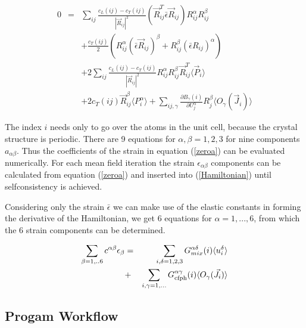 \begin{eqnarray}\label{zeroa}
0&=& \sum_{ij} \frac{c_L(ij)-c_T(ij)}{|\vec R_{ij}|^2} 
(\vec R_{ij}^T\bar \epsilon \vec R_{ij})R_{ij}^{\alpha}R_{ij}^{\beta}   \\
      && + \frac{c_T(ij)}{2} (R_{ij}^{\alpha} (\bar \epsilon \vec R_{ij})^{\beta}+R_{ij}^{\beta} (\bar \epsilon R_{ij})^{\alpha}) \nonumber \\
&& +2\sum_{ij} \frac{c_L(ij)-c_T(ij)}{|\vec R_{ij}|^2} 
R_{ij}^{\alpha}R_{ij}^{\beta} \vec R_{ij}^T \langle \vec P_{i} \rangle  \nonumber \\
      && +2 c_T(ij) \vec  R_{ij}^{\beta} \langle P_{i}^{\alpha} \rangle
+ \sum_{ij,\gamma}\frac{\partial B_{\gamma}(i)}{\partial U_j^{\alpha}}   R_j^{\beta}  \langle O_{\gamma}(\vec J_i) \rangle \nonumber
 \end{eqnarray}

The index $i$ needs only to go over the atoms in the unit cell, because the crystal structure
is periodic. There are 9 equations for $\alpha,\beta=1,2,3$ for nine components
$a_{\alpha\beta}$. Thus the coefficients of the strain  in  equation (\ref{zeroa})
can be evaluated numerically. For each mean field iteration the strain $\epsilon_{\alpha\beta}$ components
can be calculated from equation (\ref{zeroa}) and inserted into (\ref{Hamiltonian}) until
selfconsistency is achieved.

Considering only the strain $\bar \epsilon$ we can make use of the elastic constants
in forming the derivative of the Hamiltonian, 
we get 6 equations for $\alpha=1,...,6$, from which the 6 strain components can be determined.


\begin{eqnarray}\label{zeroeps}
\sum_{\beta=1,..6}  c^{\alpha\beta} \epsilon_{\beta} &=&
 \sum_{i,\delta=1,2,3}  G_{mix}^{\alpha\delta}(i)\langle u_{i}^{\delta} \rangle  \\
 &+& \sum_{i,\gamma=1,...} G_{\rm cfph}^{\alpha\gamma}(i) \langle O_{\gamma}(\vec J_i) \rangle \nonumber
\end{eqnarray}



\subsection{Progam Workflow}

